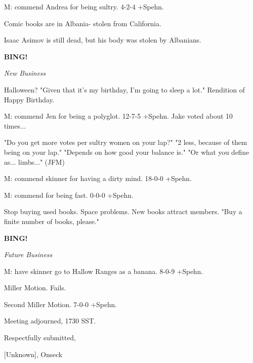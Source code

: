 \documentclass[12pt]{article}
\newcommand{\bing}{{\bf BING!} }
\newcommand{\goto}[1]{\bing \vskip 12pt \centerline{{\em{#1}}}}
\begin{document}
M: commend Andrea for being sultry. 4-2-4 +Spehn.

Comic books are in Albania- stolen from California.

Isaac Asimov is still dead, but his body was stolen by Albanians.

\goto{New Business}

Halloween? "Given that it's my birthday, I'm going to sleep a lot." Rendition of Happy Birthday.

M: commend Jen for being a polyglot. 12-7-5 +Spehn. Jake voted about 10 times...

"Do you get more votes per sultry women on your lap?" "2 less, because of them being on your lap." "Depends on how good your balance is." "Or what you define as... limbs..." (JFM)

M: commend skinner for having a dirty mind. 18-0-0 +Spehn.

M: commend for being fast. 0-0-0 +Spehn.

Stop buying used books. Space problems. New books attract members. "Buy a finite number of books, please."

\goto{Future Business}

M: have skinner go to Hallow Ranges as a banana. 8-0-9 +Spehn.

Miller Motion. Fails.

Second Miller Motion. 7-0-0 +Spehn.

\vspace{12pt}

\noindent
Meeting adjourned, 1730 SST.

\vspace{18pt}

\centerline{Respectfully submitted,}
\centerline{[Unknown], Onseck}
\end{document}
